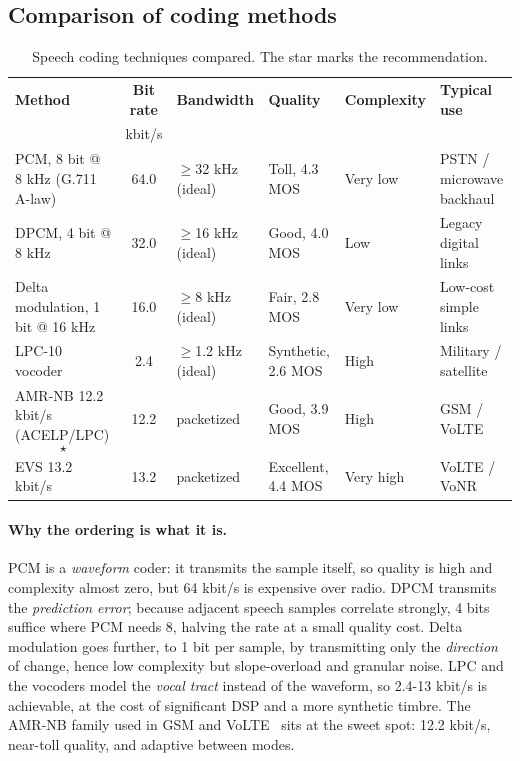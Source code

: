 \documentclass[9pt,a4paper]{extarticle}
\begin{document}
\subsection{Comparison of coding methods}
\begin{table}[H]\centering\small
\caption{Speech coding techniques compared. The star marks the recommendation.}
\label{tab:codecs}
\begin{tabularx}{\textwidth}{@{}p{4.3cm}cp{1.9cm}p{2.0cm}p{1.7cm}X@{}}
\toprule
\textbf{Method} & \textbf{Bit rate} & \textbf{Bandwidth} & \textbf{Quality} & \textbf{Complexity} & \textbf{Typical use} \\
& kbit/s & & & & \\
\midrule
PCM, 8 bit @ 8 kHz (G.711 A-law)  & 64.0 & $\geq$32 kHz (ideal) & Toll, 4.3 MOS & Very low & PSTN / microwave backhaul \\
DPCM, 4 bit @ 8 kHz  & 32.0 & $\geq$16 kHz (ideal) & Good, 4.0 MOS & Low & Legacy digital links \\
Delta modulation, 1 bit @ 16 kHz  & 16.0 & $\geq$8 kHz (ideal) & Fair, 2.8 MOS & Very low & Low-cost simple links \\
LPC-10 vocoder  & 2.4 & $\geq$1.2 kHz (ideal) & Synthetic, 2.6 MOS & High & Military / satellite \\
AMR-NB 12.2 kbit/s (ACELP/LPC) $$\star$$ & 12.2 & packetized & Good, 3.9 MOS & High & GSM / VoLTE \\
EVS 13.2 kbit/s  & 13.2 & packetized & Excellent, 4.4 MOS & Very high & VoLTE / VoNR \\
\bottomrule
\end{tabularx}
\end{table}

\paragraph{Why the ordering is what it is.} PCM is a \emph{waveform} coder: it transmits the sample
itself, so quality is high and complexity almost zero, but 64 kbit/s is expensive over radio.
DPCM transmits the \emph{prediction error}; because adjacent speech samples correlate strongly,
4 bits suffice where PCM needs 8, halving the rate at a small quality cost. Delta modulation goes
further, to 1 bit per sample, by transmitting only the \emph{direction} of change, hence low
complexity but slope-overload and granular noise. LPC and the vocoders model the \emph{vocal
tract} instead of the waveform, so 2.4-13 kbit/s is achievable, at the cost of significant DSP
and a more synthetic timbre. The AMR-NB family used in GSM and VoLTE~\cite{amr,ts26071} sits at the sweet spot:
12.2 kbit/s, near-toll quality, and adaptive between modes.
\end{document}
